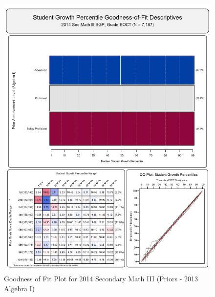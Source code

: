 \documentclass[12pt]{article}
\begin{document}
\begin{figure}[htbp]
\centering
\includegraphics{../img/Goodness_of_Fit/SEC_MATH_III.2014/2014_SEC_MATH_III_EOCT;2013_ALGEBRA_I_EOCT.png}
\caption{Goodness of Fit Plot for 2014 Secondary Math III (Priors - 2013
Algebra I)}
\end{figure}



\end{document}
